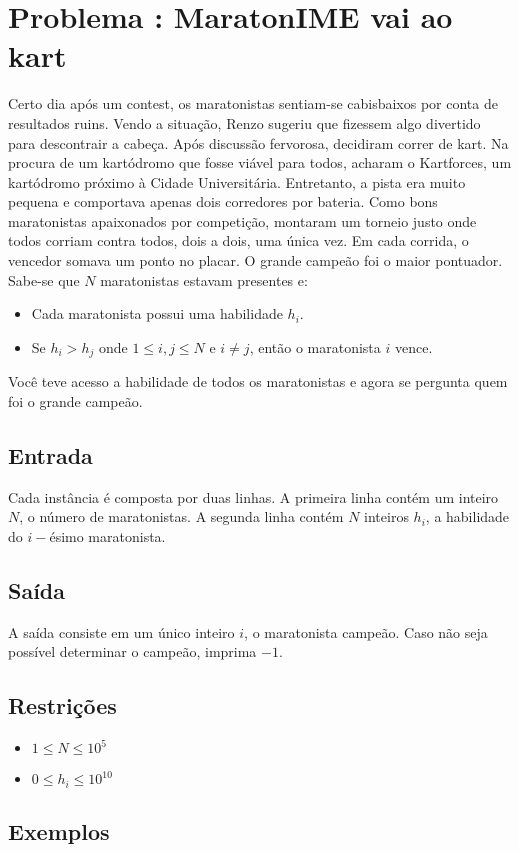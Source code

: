 \section*{Problema \proxLetra: MaratonIME vai ao kart}

Certo dia após um contest, os maratonistas sentiam-se cabisbaixos por conta de resultados ruins. Vendo a situação, Renzo sugeriu que fizessem algo divertido para descontrair a cabeça. Após discussão fervorosa, decidiram correr de kart. Na procura de um kartódromo que fosse viável para todos, acharam o Kartforces, um kartódromo próximo à Cidade Universitária. Entretanto, a pista era muito pequena e comportava apenas dois corredores por bateria. Como bons maratonistas apaixonados por competição, montaram um torneio justo onde todos corriam contra todos, dois a dois, uma única vez. Em cada corrida, o vencedor somava um ponto no placar. O grande campeão foi o maior pontuador. Sabe-se que $N$ maratonistas estavam presentes e:

\begin{itemize}
	\item Cada maratonista possui uma habilidade $h_i$.
	\item Se $h_i > h_j$ onde $1 \leq i,j \leq N$ e $i \neq j$, então o maratonista $i$ vence.
\end{itemize}

Você teve acesso a habilidade de todos os maratonistas e agora se pergunta quem foi o grande campeão.

\subsection*{Entrada}
\textoDiversasInstanciasEOF

Cada instância é composta por duas linhas. 
A primeira linha contém um inteiro $N$, o número de maratonistas.
A segunda linha contém $N$ inteiros $h_i$, a habilidade do $i-$ésimo maratonista. 


\subsection*{Saída}

A saída consiste em um único inteiro $i$, o maratonista campeão. Caso não seja possível determinar o campeão, imprima $-1$.


\subsection*{Restrições}
\begin{itemize}
  \item $1 \leq N \leq 10^5$
  \item $0 \leq h_i \leq 10^{10}$
\end{itemize}

\subsection*{Exemplos}


